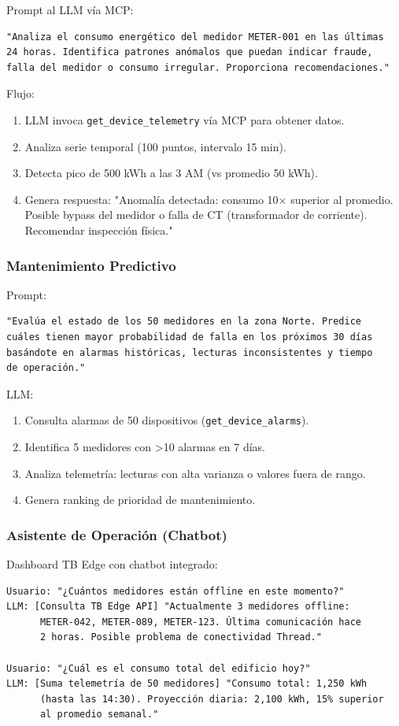 Prompt al LLM vía MCP:
\begin{verbatim}
"Analiza el consumo energético del medidor METER-001 en las últimas 
24 horas. Identifica patrones anómalos que puedan indicar fraude, 
falla del medidor o consumo irregular. Proporciona recomendaciones."
\end{verbatim}

Flujo:
\begin{enumerate}
    \item LLM invoca \texttt{get\_device\_telemetry} vía MCP para obtener datos.
    \item Analiza serie temporal (100 puntos, intervalo 15 min).
    \item Detecta pico de 500 kWh a las 3 AM (vs promedio 50 kWh).
    \item Genera respuesta: "Anomalía detectada: consumo 10$\times$ superior al promedio. Posible bypass del medidor o falla de CT (transformador de corriente). Recomendar inspección física."
\end{enumerate}

\subsubsection{Mantenimiento Predictivo}

Prompt:
\begin{verbatim}
"Evalúa el estado de los 50 medidores en la zona Norte. Predice 
cuáles tienen mayor probabilidad de falla en los próximos 30 días 
basándote en alarmas históricas, lecturas inconsistentes y tiempo 
de operación."
\end{verbatim}

LLM:
\begin{enumerate}
    \item Consulta alarmas de 50 dispositivos (\texttt{get\_device\_alarms}).
    \item Identifica 5 medidores con >10 alarmas en 7 días.
    \item Analiza telemetría: lecturas con alta varianza o valores fuera de rango.
    \item Genera ranking de prioridad de mantenimiento.
\end{enumerate}

\subsubsection{Asistente de Operación (Chatbot)}

Dashboard TB Edge con chatbot integrado:
\begin{verbatim}
Usuario: "¿Cuántos medidores están offline en este momento?"
LLM: [Consulta TB Edge API] "Actualmente 3 medidores offline: 
      METER-042, METER-089, METER-123. Última comunicación hace 
      2 horas. Posible problema de conectividad Thread."

Usuario: "¿Cuál es el consumo total del edificio hoy?"
LLM: [Suma telemetría de 50 medidores] "Consumo total: 1,250 kWh 
      (hasta las 14:30). Proyección diaria: 2,100 kWh, 15% superior 
      al promedio semanal."
\end{verbatim}

